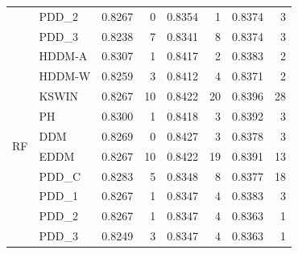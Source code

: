 \begin{table}[h]
{\begin{tabular}{llcrcrcr}
         & PDD\_2 & 0.8267 & 0 & 0.8354 & 1 & 0.8374 & 3 \\
         & PDD\_3 & 0.8238 & 7 & 0.8341 & 8 & 0.8374 & 3 \\ \midrule
        \multirow{10}{*}{RF} & HDDM-A & 0.8307 & 1 & 0.8417 & 2 & 0.8383 & 2 \\
         & HDDM-W & 0.8259 & 3 & 0.8412 & 4 & 0.8371 & 2 \\
         & KSWIN & 0.8267 & 10 & 0.8422 & 20 & 0.8396 & 28 \\
         & PH & 0.8300 & 1 & 0.8418 & 3 & 0.8392 & 3 \\
         & DDM & 0.8269 & 0 & 0.8427 & 3 & 0.8378 & 3 \\
         & EDDM & 0.8267 & 10 & 0.8422 & 19 & 0.8391 & 13 \\
         & PDD\_C & 0.8283 & 5 & 0.8348 & 8 & 0.8377 & 18 \\
         & PDD\_1 & 0.8267 & 1 & 0.8347 & 4 & 0.8383 & 3 \\
         & PDD\_2 & 0.8267 & 1 & 0.8347 & 4 & 0.8363 & 1 \\
         & PDD\_3 & 0.8249 & 3 & 0.8347 & 4 & 0.8363 & 1 \\\bottomrule
    \end{tabular}}
\end{table}
